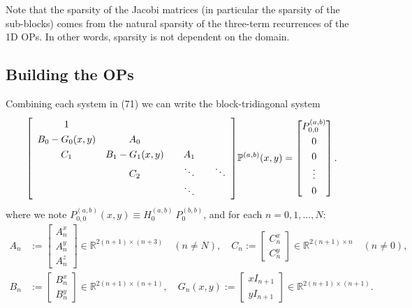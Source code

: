 \documentclass[11pt, oneside]{article}   	%
\newcommand{\sotodo}{\todo[color=green]}
\newcommand{\R}{\mathbb{R}}
\newcommand{\bigP}{\mathbb{P}}
\newcommand{\bigPab}{\bigP^{(a,b)}}
\begin{document}
Note that the sparsity of the Jacobi matrices (in particular the sparsity of the sub-blocks) comes from the natural sparsity of the three-term recurrences of the 1D OPs. In other words, sparsity is not dependent on the domain\sotodo{Huh?}.




\subsection{Building the OPs} 

Combining each system in (71) we can write the block-tridiagonal system
\begin{align}
\renewcommand\arraystretch{1.3}
\mleft[
\begin{array}{cccc}
		1 & & & \\
		B_0-G_0(x,y) & A_0 & & \\
		C_1 & B_1-G_1(x,y) & \quad A_1 \quad & \\
		& C_2 & \ddots & \ddots \\
		& & \ddots &
\end{array}
\mright]
\bigPab(x,y)
=
\begin{bmatrix}
	P^{(a,b)}_{0,0} \\ 0 \\ 0 \\ \vdots \\ 0 \\
\end{bmatrix}.
\end{align}
where we note \(P^{(a,b)}_{0,0}(x,y) \equiv H_0^{(a,b)} \: P_0^{(b,b)}\), and for each \(n = 0,1,\dots,N\):
\begin{align}
A_n &:= \begin{bmatrix}
		A^x_n \\
		A^y_n \\
		A^z_n
	    \end{bmatrix} \in \R^{2(n+1)\times(n+3)} \quad (n \ne N), \quad
C_n := \begin{bmatrix}
		C^x_n \\
		C^y_n
	    \end{bmatrix} \in \R^{2(n+1)\times n} \quad (n \ne 0), \nonumber \\
B_n &:= \begin{bmatrix}
		B^x_n \\
		B^y_n
	    \end{bmatrix} \in \R^{2(n+1)\times(n+1)}, \quad
G_n(x,y) := \begin{bmatrix}
		xI_{n+1} \\
		yI_{n+1}
	    \end{bmatrix} \in \R^{2(n+1)\times(n+1)}.
\end{align}
 
\end{document}

